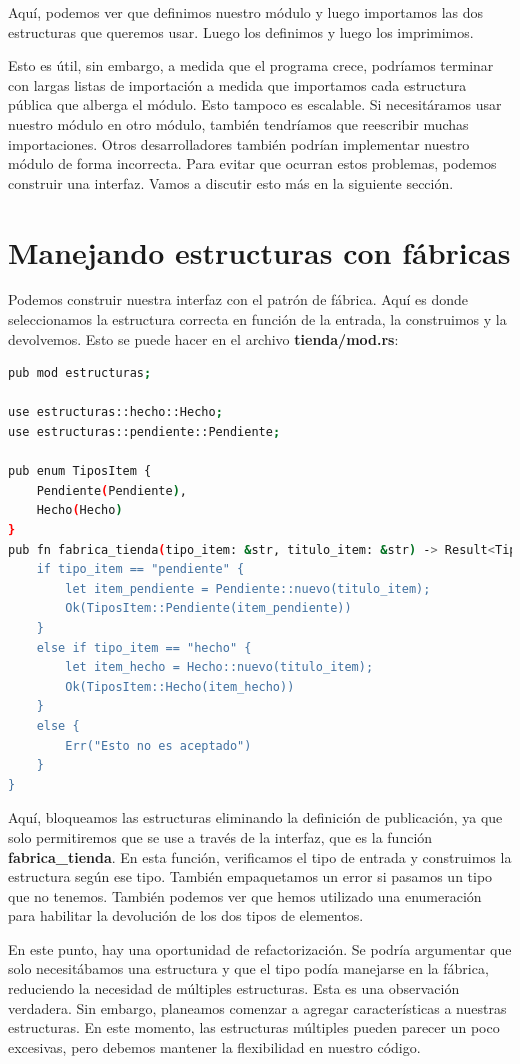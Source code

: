 Aquí, podemos ver que definimos nuestro módulo y luego importamos las dos estructuras que queremos usar. Luego los definimos y luego los imprimimos.

Esto es útil, sin embargo, a medida que el programa crece, podríamos terminar con largas listas de importación a medida que importamos cada estructura pública que alberga el módulo. Esto tampoco es escalable. Si necesitáramos usar nuestro módulo en otro módulo, también tendríamos que reescribir muchas importaciones. Otros desarrolladores también podrían implementar nuestro módulo de forma incorrecta. Para evitar que ocurran estos problemas, podemos construir una interfaz. Vamos a discutir esto más en la siguiente sección.

\section{Manejando estructuras con fábricas}

Podemos construir nuestra interfaz con el patrón de fábrica. Aquí es donde seleccionamos la estructura correcta en función de la entrada, la construimos y la devolvemos. Esto se puede hacer en el archivo \textbf{tienda/mod.rs}:


\begin{lstlisting}[language=bash]
pub mod estructuras;

use estructuras::hecho::Hecho;
use estructuras::pendiente::Pendiente;

pub enum TiposItem {
	Pendiente(Pendiente),
	Hecho(Hecho)
}
pub fn fabrica_tienda(tipo_item: &str, titulo_item: &str) -> Result<TiposItem, &'static str> {
	if tipo_item == "pendiente" {
		let item_pendiente = Pendiente::nuevo(titulo_item);
		Ok(TiposItem::Pendiente(item_pendiente))
	}
	else if tipo_item == "hecho" {
		let item_hecho = Hecho::nuevo(titulo_item);
		Ok(TiposItem::Hecho(item_hecho))
	}
	else {
		Err("Esto no es aceptado")
	}
}
\end{lstlisting}

Aquí, bloqueamos las estructuras eliminando la definición de publicación, ya que solo permitiremos que se use a través de la interfaz, que es la función \textbf{fabrica\_tienda}. En esta función, verificamos el tipo de entrada y construimos la estructura según ese tipo. También empaquetamos un error si pasamos un tipo que no tenemos. También podemos ver que hemos utilizado una enumeración para habilitar la devolución de los dos tipos de elementos.

En este punto, hay una oportunidad de refactorización. Se podría argumentar que solo necesitábamos una estructura y que el tipo podía manejarse en la fábrica, reduciendo la necesidad de múltiples estructuras. Esta es una observación verdadera. Sin embargo, planeamos comenzar a agregar características a nuestras estructuras. En este momento, las estructuras múltiples pueden parecer un poco excesivas, pero debemos mantener la flexibilidad en nuestro código.

